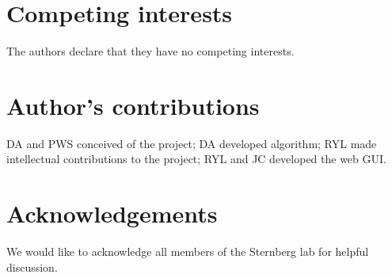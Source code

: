 \documentclass[linenumbers, doublespacing]{bmcart}
\begin{document}
\begin{backmatter}

\section*{Competing interests}
 	The authors declare that they have no competing interests.
\section*{Author's contributions}
    DA and PWS conceived of the project; DA developed algorithm; 
	RYL made intellectual contributions to the project; RYL and JC 
	developed the web GUI.
\section*{Acknowledgements}
	We would like to acknowledge all members of the Sternberg
	lab for helpful discussion. 





\end{backmatter}
\end{document}
